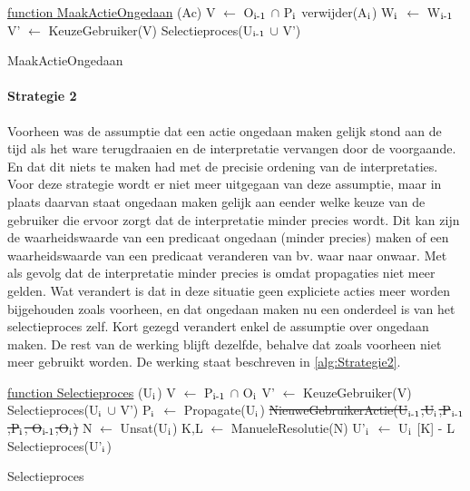 \begin{algorithm}
	\underline{function MaakActieOngedaan} (Ac)\;
	\Output{}
	V $\leftarrow$ O$\textsubscript{i-1}$ $\cap$ P$\textsubscript{i}$\;
	verwijder(A$\textsubscript{i}$)\;
	W$\textsubscript{i}$ $\leftarrow$ W$\textsubscript{i-1}$\;
		{
		V' $\leftarrow$ KeuzeGebruiker(V)\;
			{
			Selectieproces(U$\textsubscript{i-1}$ $\cup$ V')\;
			}
		}
	\caption{MaakActieOngedaan\label{alg:Strategie1b}}
\end{algorithm}

\paragraph{Strategie 2}
Voorheen was de assumptie dat een actie ongedaan maken gelijk stond aan de tijd als het ware terugdraaien en de interpretatie vervangen door de voorgaande. En dat dit niets te maken had met de precisie ordening van de interpretaties. Voor deze strategie wordt er niet meer uitgegaan van deze assumptie, maar in plaats daarvan staat ongedaan maken gelijk aan eender welke keuze van de gebruiker die ervoor zorgt dat de interpretatie minder precies wordt. Dit kan zijn de waarheidswaarde van een predicaat ongedaan (minder precies) maken of een waarheidswaarde van een predicaat veranderen van bv. waar naar onwaar. Met als gevolg dat de interpretatie minder precies is omdat propagaties niet meer gelden. Wat verandert is dat in deze situatie geen expliciete acties meer worden bijgehouden zoals voorheen, en dat ongedaan maken nu een onderdeel is van het selectieproces zelf. Kort gezegd verandert enkel de assumptie over ongedaan maken. De rest van de werking blijft dezelfde, behalve dat zoals voorheen niet meer gebruikt worden. De werking staat beschreven in \ref{alg:Strategie2}.

\begin{algorithm}
	\underline{function Selectieproces} (U$\textsubscript{i}$)\;
	\Output{}
		{
		V $\leftarrow$ P$\textsubscript{i-1}$ $\cap$ O$\textsubscript{i}$\;
			{
			V' $\leftarrow$ KeuzeGebruiker(V)\; 
			Selectieproces(U$\textsubscript{i}$ $\cup$ V')\;
			}
			{
			P$\textsubscript{i}$ $\leftarrow$ Propagate(U$\textsubscript{i}$)\;	
			\sout{NieuweGebruikerActie(U$\textsubscript{i-1}$,U$\textsubscript{i}				$,P$\textsubscript{i-1}$,P$\textsubscript{i}$,
			O$\textsubscript{i-1}$,O$\textsubscript{i}$)}\;
			}
		}
		{
		N $\leftarrow$ Unsat(U$\textsubscript{i}$)\; 
		K,L $\leftarrow$ ManueleResolutie(N)\;
		U'$\textsubscript{i}$ $\leftarrow$ U$\textsubscript{i}$ 
		[K] - L\; 
		Selectieproces(U'$\textsubscript{i}$)\;
		}
	\caption{Selectieproces\label{alg:Strategie2}}
\end{algorithm}

